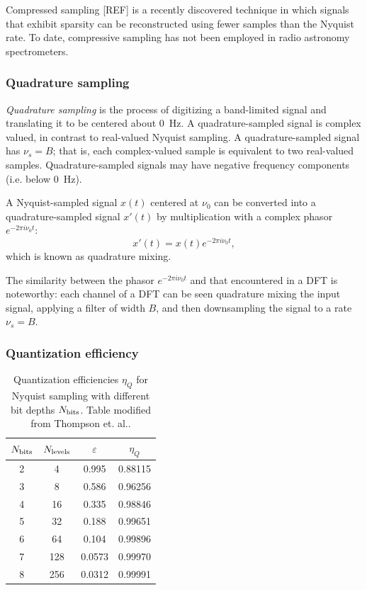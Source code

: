 \documentclass{ws-rv961x669}
\begin{document}
Compressed sampling [REF] is a recently discovered technique in which signals that exhibit sparsity can be reconstructed using fewer samples than the Nyquist rate. To date, compressive sampling has not been employed in radio astronomy spectrometers.

\subsubsection{Quadrature sampling}

\emph{Quadrature sampling}\cite{Lyons:2000uy} is the process of digitizing a band-limited signal and translating it to be centered about 0~Hz. A quadrature-sampled signal is complex valued, in contrast to real-valued Nyquist sampling. A quadrature-sampled signal has $\nu_{s} = B$; that is, each complex-valued sample is equivalent to two real-valued samples. Quadrature-sampled signals may have negative frequency components (i.e. below 0~Hz).

A Nyquist-sampled signal $x(t)$ centered at $\nu_0$ can be converted into a quadrature-sampled signal $x'(t)$ by multiplication with a complex phasor $e^{-2\pi i \nu_0 t}$:
\begin{equation}
	x'(t) = x(t) e^{-2 \pi i \nu_0 t},
\end{equation}
which is known as quadrature mixing.

The similarity between the phasor $e^{-2\pi i \nu_0 t}$ and that encountered in a DFT is noteworthy: each channel of a DFT can be seen quadrature mixing the input signal, applying a filter of width $B$, and then downsampling the signal to a rate $\nu_s=B$.

\subsubsection{Quantization efficiency \label{sub:quant}}

\begin{table}
	\caption{Quantization efficiencies $\eta_Q$ for Nyquist sampling with different bit depths $N_{\rm{bits}}$. Table modified from Thompson et. al.\citep{Thompson:2007p8886}.\label{tab:quant_eff}}
	\begin{center}
	\begin{tabular}{c c c c}
	\hline
	$N_{\rm{bits}}$ & $N_{\rm{levels}}$ & $\varepsilon$ & $\eta_Q$ \\
	\hline
	\hline
	2 & 4   & 0.995  & 0.88115 \\
	3 & 8   & 0.586  & 0.96256 \\
	4 & 16  & 0.335  & 0.98846 \\
	5 & 32  & 0.188  & 0.99651 \\
	6 & 64  & 0.104  & 0.99896 \\
	7 & 128 & 0.0573 & 0.99970 \\
	8 & 256 & 0.0312 & 0.99991 \\
	\hline
	\end{tabular}
	\end{center}
\end{table}
\end{document}
